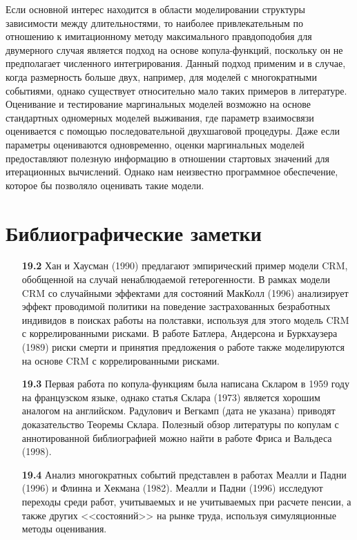 Если основной интерес находится в области моделировании структуры зависимости между длительностями, то наиболее привлекательным по отношению к имитационному методу максимального правдоподобия для двумерного случая является подход на основе копула-функций, поскольку он не предполагает численного интегрирования. Данный подход применим и в случае, когда размерность больше двух, например, для моделей с многократными событиями, однако существует относительно мало таких примеров в литературе. Оценивание и тестирование маргинальных моделей возможно на основе стандартных одномерных моделей выживания, где параметр взаимосвязи оценивается с помощью последовательной двухшаговой процедуры. Даже если параметры оцениваются одновременно, оценки маргинальных моделей предоставляют полезную информацию в отношении стартовых значений для итерационных вычислений. Однако нам неизвестно программное обеспечение, которое бы позволяло оценивать такие модели.




\section{Библиографические заметки}\label{sec:19.7}

\begin{itemize}

    \item[\textbf{19.2}]
Хан и Хаусман (1990) предлагают эмпирический пример модели CRM, обобщенной на случай ненаблюдаемой гетерогенности.
В рамках модели CRM со случайными эффектами для состояний МакКолл (1996) анализирует эффект проводимой политики на поведение застрахованных безработных индивидов в поисках работы на полставки, используя для этого модель CRM с коррелированными рисками. В работе Батлера, Андерсона и Буркхаузера (1989) риски смерти и принятия предложения о работе также моделируются на основе CRM с коррелированными рисками.

    \item[\textbf{19.3}]
Первая работа по копула-функциям была написана Скларом в 1959 году на французском языке, однако статья Склара (1973) является хорошим аналогом на английском. Радулович и Вегкамп (дата не указана) приводят доказательство Теоремы Склара. Полезный обзор литературы по копулам с аннотированной библиографией можно найти в работе Фриса и Вальдеса (1998).

    \item[\textbf{19.4}]
Анализ многократных событий представлен в работах Меалли и Падни (1996) и Флинна и Хекмана (1982). Меалли и Падни (1996) исследуют переходы среди работ, учитываемых и не учитываемых при расчете пенсии, а также других <<состояний>> на рынке труда, используя симуляционные методы оценивания.

\end{itemize}


